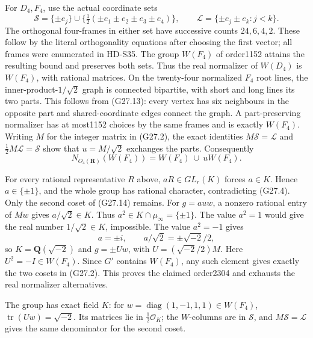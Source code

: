 For \(D_4,F_4\), use the actual coordinate sets
\[
 \mathcal S=\{\pm e_j\}\cup
       \{\tfrac12(\pm e_1\pm e_2\pm e_3\pm e_4)\},\qquad
 \mathcal L=\{\pm e_j\pm e_k:j<k\}.                         \tag{G27.13}
\]
The orthogonal four-frames in either set have successive
counts \(24,6,4,2\). These follow by the literal orthogonality
equations after choosing the first vector; all frames were
enumerated in HD-S35. The group \(W(F_4)\) of order1152
attains the resulting bound and preserves both sets.
Thus the real normalizer of \(W(D_4)\) is \(W(F_4)\),
with rational matrices.
On the twenty-four normalized \(F_4\) root lines, the
inner-product-\(1/\sqrt2\) graph is connected bipartite,
with short and long lines its two parts. This follows from
(G27.13): every vertex has six neighbours in the opposite
part and shared-coordinate edges connect the graph.
A part-preserving normalizer has at most1152 choices by
the same frames and is exactly \(W(F_4)\).
Writing \(M\) for the integer matrix in (G27.2), the exact
identities \(M\mathcal S=\mathcal L\) and
\(\frac12M\mathcal L=\mathcal S\) show that
\(u=M/\sqrt2\) exchanges the parts. Consequently
\[
           N_{O_4(\mathbf R)}(W(F_4))
                     =W(F_4)\ \cup\ uW(F_4).                \tag{G27.14}
\]

For every rational representative \(R\) above, \(aR\in GL_r(K)\)
forces \(a\in K\). Hence \(a\in\{\pm1\}\), and the whole
group has rational character, contradicting (G27.4).
Only the second coset of (G27.14) remains.
For \(g=auw\), a nonzero rational entry of \(Mw\) gives
\(a/\sqrt2\in K\). Thus \(a^2\in K\cap\mu_\infty=\{\pm1\}\).
The value \(a^2=1\) would give the real number
\(1/\sqrt2\in K\), impossible. The value \(a^2=-1\)
gives
\[
          a=\pm i,\qquad a/\sqrt2=\pm\sqrt{-2}/2,
\]
so \(K=\mathbf Q(\sqrt{-2})\) and \(g=\pm Uw\), with
\(U=(\sqrt{-2}/2)M\). Here \(U^2=-I\in W(F_4)\).
Since \(G'\) contains \(W(F_4)\), any such element gives
exactly the two cosets in (G27.2). This proves the claimed
order2304 and exhausts the real normalizer alternatives.

The group has exact field \(K\): for
\(w=\operatorname{diag}(1,-1,1,1)\in W(F_4)\),
\(\operatorname{tr}(Uw)=\sqrt{-2}\).
Its matrices lie in \(\tfrac12\mathcal O_K\);
the \(W\)-columns are in \(\mathcal S\), and
\(M\mathcal S=\mathcal L\) gives the same denominator
for the second coset.

